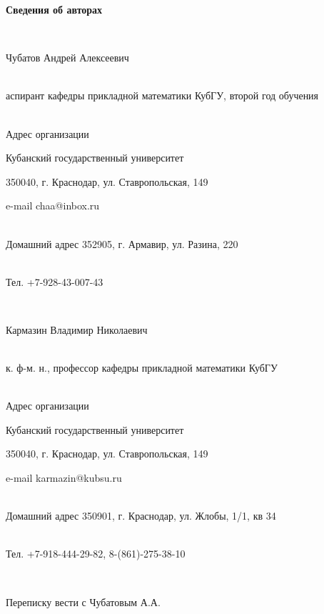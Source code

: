 \documentclass[10pt,a4paper,twoside]{article}
\begin{document}
\pagestyle{empty}





{\bf Сведения об авторах}


\\





 \noindent


 Чубатов Андрей Алексеевич


 \\


 аспирант кафедры прикладной математики КубГУ, второй год обучения


 \\


 Адрес организации





    Кубанский государственный университет





    350040, г. Краснодар, ул. Ставропольская, 149





 \noindent


 e-mail  chaa@inbox.ru


 \\


 Домашний адрес  352905, г. Армавир, ул. Разина, 220


 \\


 Тел. +7-928-43-007-43


 \\





 \noindent


 Кармазин Владимир Николаевич


 \\


 к. ф-м. н., профессор кафедры прикладной математики КубГУ


 \\Адрес организации





    Кубанский государственный университет





    350040, г. Краснодар, ул. Ставропольская, 149





 \noindent


 e-mail  karmazin@kubsu.ru


 \\


 Домашний адрес  350901, г. Краснодар, ул. Жлобы, 1/1, кв 34


 \\


 Тел. +7-918-444-29-82, 8-(861)-275-38-10


\\





 \noindent


 Переписку вести с Чубатовым А.А.
\end{document}
